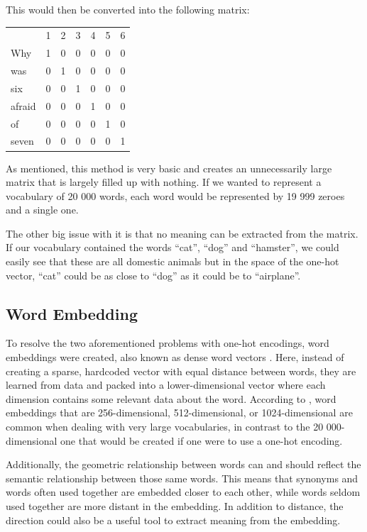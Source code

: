 \documentclass[nofilelist]{cslthse-msc}
\begin{document}
This would then be converted into the following matrix:

\begin{center}
    \begin{tabular}{lllllll}
                            & 1 & 2 & 3 & 4 & 5 & 6 \\ \cline{2-7} 
\multicolumn{1}{l|}{Why}    & 1 & 0 & 0 & 0 & 0 & 0 \\
\multicolumn{1}{l|}{was}    & 0 & 1 & 0 & 0 & 0 & 0 \\
\multicolumn{1}{l|}{six}    & 0 & 0 & 1 & 0 & 0 & 0 \\
\multicolumn{1}{l|}{afraid} & 0 & 0 & 0 & 1 & 0 & 0 \\
\multicolumn{1}{l|}{of}     & 0 & 0 & 0 & 0 & 1 & 0 \\
\multicolumn{1}{l|}{seven}  & 0 & 0 & 0 & 0 & 0 & 1
    \end{tabular}
\end{center}

As mentioned, this method is very basic and creates an unnecessarily large matrix that is largely filled up with nothing. If we wanted to represent a vocabulary of 20 000 words, each word would be represented by 19 999 zeroes and a single one. 

The other big issue with it is that no meaning can be extracted from the matrix. If our vocabulary contained the words ``cat'', ``dog'' and ``hamster'', we could easily see that these are all domestic animals but in the space of the one-hot vector, ``cat'' could be as close to ``dog'' as it could be to ``airplane''. 

\subsection{Word Embedding}
To resolve the two aforementioned problems with one-hot encodings, word embeddings were created, also known as dense word vectors \citep{neuralnetworkmethods}. 
Here, instead of creating a sparse, hardcoded vector with equal distance between words, they are learned from data and packed into a lower-dimensional vector where each dimension contains some relevant data about the word. According to \citet{franoischollet2017learning}, word embeddings that are 256-dimensional, 512-dimensional, or 1024-dimensional are common when dealing with very large vocabularies, in contrast to the 20 000-dimensional one that would be created if one were to use a one-hot encoding. 

Additionally, the geometric relationship between words can and should reflect the semantic relationship between those same words. This means that synonyms and words often used together are embedded closer to each other, while words seldom used together are more distant in the embedding. In addition to distance, the direction could also be a useful tool to extract meaning from the embedding. %
\end{document}
